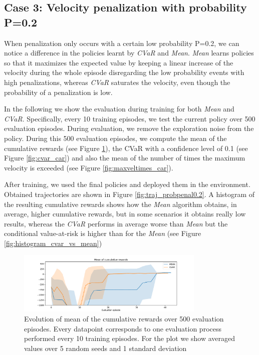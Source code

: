 \newpage
\subsection{Case 3: Velocity penalization with probability P=0.2 }
When penalization only occurs with a certain low probability P=0.2, we can notice a difference
in the policies learnt by \textit{CVaR} and \textit{Mean}.
\textit{Mean} learns policies so that it maximizes the expected
value by keeping a linear increase of the velocity during the whole episode disregarding the low probability events with high penalizations,
whereas \textit{CVaR} saturates the velocity, even though the
probability of a penalization is low.

In the following we show the evaluation during training for both \textit{Mean} and
\textit{CVaR}.
Specifically, every 10 training episodes, we test the current policy over 500 evaluation episodes.
During evaluation, we remove the exploration noise from the policy.
During this 500 evaluation episodes, we compute the mean of the cumulative rewards (see Figure \ref{fig:mean_car}),
the CVaR with a confidence level of 0.1  (see Figure \ref{fig:cvar_car}) and also the mean of the number of times the 
maximum velocity is exceeded  (see Figure \ref{fig:maxveltimes_car}). 

After training, we used the final policies and deployed them in the 
environment. Obtained trajectories are shown in Figure \ref{fig:traj_probpenal0.2}.
A histogram of the resulting cumulative rewards shows
how the \textit{Mean} algorithm obtains, in average, higher cumulative rewards, but in some scenarios it 
obtains really low results, whereas the \textit{CVaR} performs in average worse than \textit{Mean} 
but the conditional value-at-risk is higher than for the \textit{Mean} (see Figure \ref{fig:histogram_cvar_vs_mean})

\begin{figure}[ht]
        \centering
        \includegraphics[width=0.8\textwidth]{images/Car/CVAR/mean_train_withstds.pdf}
        \caption{Evolution of mean of the cumulative rewards over 500 evaluation episodes.
        Every datapoint corresponds
        to one evaluation process performed every 10 training episodes. For the plot we
        show averaged values over 5 random seeds and 1 standard deviation}
        \label{fig:mean_car}
    
\end{figure}

